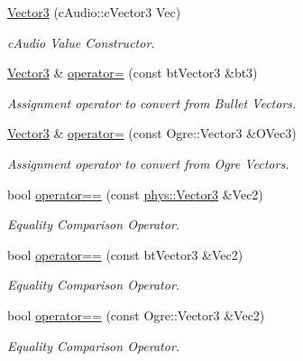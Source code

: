 \begin{DoxyCompactItemize}
\hyperlink{classphys_1_1Vector3_a0ed3fe0518fc5e29544234bd41091401}{Vector3} (cAudio::cVector3 Vec)
\begin{DoxyCompactList}\small\item\em cAudio Value Constructor. \item\end{DoxyCompactList}\item 
\hyperlink{classphys_1_1Vector3}{Vector3} \& \hyperlink{classphys_1_1Vector3_a81a755b7fd93ad523c63befe773b7359}{operator=} (const btVector3 \&bt3)
\begin{DoxyCompactList}\small\item\em Assignment operator to convert from Bullet Vectors. \item\end{DoxyCompactList}\item 
\hyperlink{classphys_1_1Vector3}{Vector3} \& \hyperlink{classphys_1_1Vector3_a4c9602b683617d91a68ec1e885522b8b}{operator=} (const Ogre::Vector3 \&OVec3)
\begin{DoxyCompactList}\small\item\em Assignment operator to convert from Ogre Vectors. \item\end{DoxyCompactList}\item 
bool \hyperlink{classphys_1_1Vector3_a90dadb1a5cd2c5814e54c11c33f286c1}{operator==} (const \hyperlink{classphys_1_1Vector3}{phys::Vector3} \&Vec2)
\begin{DoxyCompactList}\small\item\em Equality Comparison Operator. \item\end{DoxyCompactList}\item 
bool \hyperlink{classphys_1_1Vector3_a1146d1b1b0f3d8809edfbd24e79b724a}{operator==} (const btVector3 \&Vec2)
\begin{DoxyCompactList}\small\item\em Equality Comparison Operator. \item\end{DoxyCompactList}\item 
bool \hyperlink{classphys_1_1Vector3_aef82f53ef74363d7b662cbd1d3c204db}{operator==} (const Ogre::Vector3 \&Vec2)
\begin{DoxyCompactList}\small\item\em Equality Comparison Operator. \item\end{DoxyCompactList}\item 

\end{DoxyCompactItemize}
